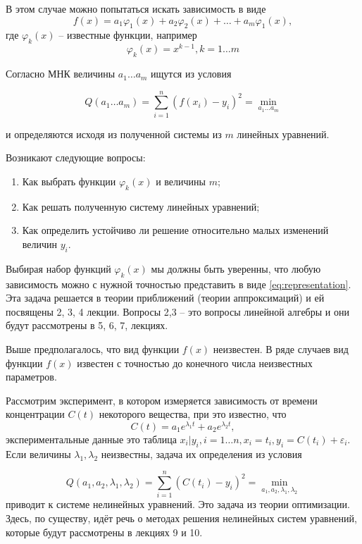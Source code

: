 В этом случае можно попытаться искать зависимость в виде 
\begin{equation} \label{eq:representation}
	f(x) = a_1 \varphi _1(x) + a_2 \varphi _2(x) + \dots + a_m \varphi _1(x),
\end{equation}
где $\varphi _k(x)$ -- известные функции, например
\begin{equation}
	\varphi _k(x) = x^{k-1},  k = 1 \dots m
\end{equation}

Согласно МНК величины $a_1 \dots a_m$ ищутся из условия

 \begin{equation}
	Q(a_1 \dots a_m) = \sum^n_{i=1}{(f(x_i) -y_i)^2} = \min_{a_1 \dots a_m}
\end{equation}

и определяются исходя из полученной системы из $m$ линейных уравнений.

Возникают следующие вопросы:
\begin{enumerate}
	\item Как выбрать функции $\varphi _k(x)$ и величины $m$;
	\item Как решать полученную систему линейных уравнений;
	\item Как определить устойчиво ли решение относительно малых изменений величин $y_i$.
\end{enumerate}


Выбирая набор функций $\varphi _k(x)$ мы должны быть уверенны, что любую зависимость можно с нужной точностью представить в виде \ref{eq:representation}. Эта задача решается в теории приближений (теории аппроксимаций) и ей посвящены 2, 3, 4 лекции. Вопросы 2,3 -- это вопросы линейной алгебры и они будут рассмотрены в 5, 6, 7, лекциях.

Выше предполагалось, что вид функции $f(x)$ неизвестен. В ряде случаев вид функции  $f(x)$ известен с точностью до конечного числа неизвестных параметров.

Рассмотрим эксперимент, в котором измеряется зависимость от времени концентрации $C(t)$ некоторого вещества, при это известно, что 
\begin{equation}
	C(t) = a_1e^{\lambda_1 t} + a_2 e^{\lambda_2 t},
\end{equation}
экспериментальные данные это таблица $x_i | y_i, i=1\dots n, x_i = t_i, y_i = C(t_i) + \varepsilon_i$. Если величины $\lambda_1, \lambda_2$ неизвестны, задача их определения из условия

 \begin{equation}
	Q(a_1,a_2,\lambda_1, \lambda_2) = \sum^n_{i=1}{(C(t_i) -y_i)^2} = \min_{a_1,a_2,\lambda_1, \lambda_2}
\end{equation}
приводит к системе нелинейных уравнений. Это задача из теории оптимизации. Здесь, по существу, идёт речь о методах решения нелинейных систем уравнений, которые будут рассмотрены в лекциях 9 и 10.

